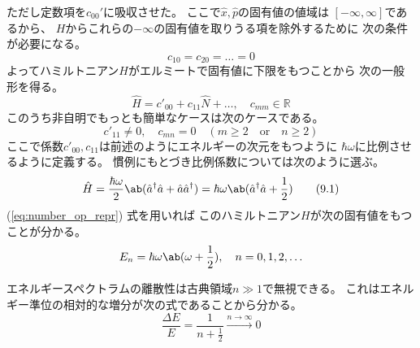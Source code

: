ただし定数項を$c_{00}'$に吸収させた。
ここで$\hat{x},\hat{p}$の固有値の値域は
$[-\infty,\infty]$であるから、
$H$からこれらの$-\infty$の固有値を取りうる項を除外するために
次の条件が必要になる。
\begin{equation}
  c_{10}=c_{20}=\ldots=0
\end{equation}
よってハミルトニアン$H$がエルミートで固有値に下限をもつことから
次の一般形を得る。
\begin{equation}
  \hat{H}
  =c'_{00}+c_{11}\hat{N}+\ldots,\quad
  c_{mm}\in\mathbb{R}
\end{equation}
このうち非自明でもっとも簡単なケースは次のケースである。
\begin{equation}
  c'_{11}\neq0,\quad
  c_{mn} = 0\quad(m\geq2\quad\text{or}\quad n\geq2)
\end{equation}
ここで係数$c'_{00},c_{11}$は前述のようにエネルギーの次元をもつように
$\hbar\omega$に比例させるように定義する。
慣例にもとづき比例係数については次のように選ぶ。
\begin{equation}
  \label{eq:ladder_H}
  \hat{H}
  =\frac{\hbar\omega}{2}\ab(\hat{a}^\dagger\hat{a}+\hat{a}\hat{a}^\dagger)
  =\hbar\omega\ab(\hat{a}^\dagger\hat{a}+\frac{1}{2})
  \tag{9.1}
\end{equation}
(\ref{eq:number_op_repr}) 式を用いれば
このハミルトニアン$H$が次の固有値をもつことが分かる。
\begin{equation}
  E_n=\hbar\omega\ab(\omega+\frac{1}{2}),\quad
  n=0,1,2,\ldots
\end{equation}

エネルギースペクトラムの離散性は古典領域$n\gg1$で無視できる。
これはエネルギー準位の相対的な増分が次の式であることから分かる。
\begin{equation}
  \frac{\Delta E}{E} = \frac{1}{n+\frac{1}{2}}
  \overset{n\rightarrow\infty}{\longrightarrow}0
\end{equation}

